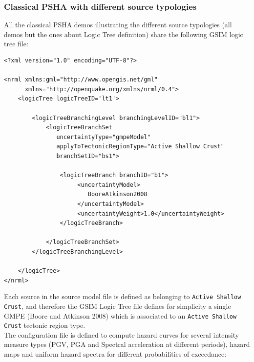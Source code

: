 \subsubsection{Classical PSHA with different source typologies}
All the classical PSHA demos illustrating the different source typologies (all demos but the ones about Logic Tree definition)
share the following GSIM logic tree file:
\begin{Verbatim}[frame=single, commandchars=\\\{\}, fontsize=\normalsize]
<?xml version="1.0" encoding="UTF-8"?>

<nrml xmlns:gml="http://www.opengis.net/gml"
      xmlns="http://openquake.org/xmlns/nrml/0.4">
    <logicTree logicTreeID='lt1'>

        <logicTreeBranchingLevel branchingLevelID="bl1">
            <logicTreeBranchSet
               uncertaintyType="gmpeModel"
               applyToTectonicRegionType="Active Shallow Crust"
               branchSetID="bs1">

                <logicTreeBranch branchID="b1">
                     <uncertaintyModel>
                        BooreAtkinson2008
                     </uncertaintyModel>
                     <uncertaintyWeight>1.0</uncertaintyWeight>
                </logicTreeBranch>

            </logicTreeBranchSet>
        </logicTreeBranchingLevel>

    </logicTree>
</nrml>
\end{Verbatim}
Each source in the source model file is defined as belonging to \texttt{Active Shallow Crust}, and therefore the GSIM Logic Tree file
defines for simplicity a single GMPE (Boore and Atkinson 2008) which is associated to an \texttt{Active Shallow Crust} tectonic region type.\\
The configuration file is defined to compute hazard curves for several intensity measure types (PGV, PGA and Spectral
acceleration at different periods), hazard maps and uniform hazard spectra for different probabilities of exceedance:
